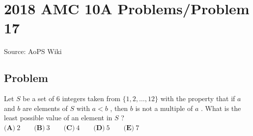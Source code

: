 \documentclass[12pt]{article}
\begin{document}
\section*{{2018 AMC 10A Problems/Problem 17}}
Source: AoPS Wiki

\subsection*{Problem}
Let $S$ be a set of $6$ integers taken from $\{1,2,\dots,12\}$ with the property that if $a$ and $b$ are elements of $S$ with $a<b$ , then $b$ is not a multiple of $a$ . What is the least possible value of an element in $S$ ? $\textbf{(A)}\ 2\qquad\textbf{(B)}\ 3\qquad\textbf{(C)}\ 4\qquad\textbf{(D)}\ 5\qquad\textbf{(E)}\ 7$
\end{document}
